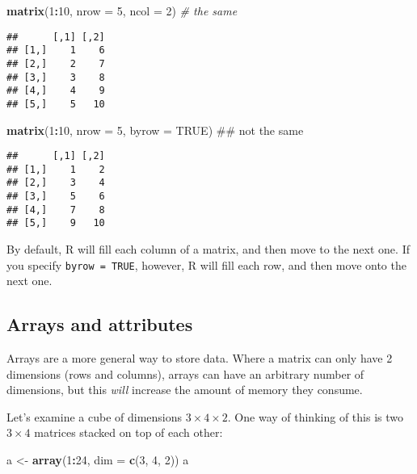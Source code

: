 \documentclass[]{article}
\newenvironment{Shaded}{\begin{snugshade}}{\end{snugshade}}
\newcommand{\KeywordTok}[1]{\textcolor[rgb]{0.13,0.29,0.53}{\textbf{#1}}}
\newcommand{\DataTypeTok}[1]{\textcolor[rgb]{0.13,0.29,0.53}{#1}}
\newcommand{\DecValTok}[1]{\textcolor[rgb]{0.00,0.00,0.81}{#1}}
\newcommand{\StringTok}[1]{\textcolor[rgb]{0.31,0.60,0.02}{#1}}
\newcommand{\CommentTok}[1]{\textcolor[rgb]{0.56,0.35,0.01}{\textit{#1}}}
\newcommand{\OtherTok}[1]{\textcolor[rgb]{0.56,0.35,0.01}{#1}}
\newcommand{\OperatorTok}[1]{\textcolor[rgb]{0.81,0.36,0.00}{\textbf{#1}}}
\newcommand{\NormalTok}[1]{#1}
\begin{document}
\begin{Shaded}
\begin{Highlighting}[]
\KeywordTok{matrix}\NormalTok{(}\DecValTok{1}\OperatorTok{:}\DecValTok{10}\NormalTok{, }\DataTypeTok{nrow =} \DecValTok{5}\NormalTok{, }\DataTypeTok{ncol =} \DecValTok{2}\NormalTok{) }\CommentTok{# the same}
\end{Highlighting}
\end{Shaded}

\begin{verbatim}
##      [,1] [,2]
## [1,]    1    6
## [2,]    2    7
## [3,]    3    8
## [4,]    4    9
## [5,]    5   10
\end{verbatim}

\begin{Shaded}
\begin{Highlighting}[]
\KeywordTok{matrix}\NormalTok{(}\DecValTok{1}\OperatorTok{:}\DecValTok{10}\NormalTok{, }\DataTypeTok{nrow =} \DecValTok{5}\NormalTok{, }\DataTypeTok{byrow =} \OtherTok{TRUE}\NormalTok{) ## not the same}
\end{Highlighting}
\end{Shaded}

\begin{verbatim}
##      [,1] [,2]
## [1,]    1    2
## [2,]    3    4
## [3,]    5    6
## [4,]    7    8
## [5,]    9   10
\end{verbatim}

By default, R will fill each column of a matrix, and then move to the
next one. If you specify \texttt{byrow = TRUE}, however, R will fill
each row, and then move onto the next one.

\subsection{Arrays and attributes}\label{arrays-and-attributes}

Arrays are a more general way to store data. Where a matrix can only
have 2 dimensions (rows and columns), arrays can have an arbitrary
number of dimensions, but this \emph{will} increase the amount of memory
they consume.

Let's examine a cube of dimensions \(3 \times 4 \times 2\). One way of
thinking of this is two \(3 \times 4\) matrices stacked on top of each
other:

\begin{Shaded}
\begin{Highlighting}[]
\NormalTok{a <-}\StringTok{ }\KeywordTok{array}\NormalTok{(}\DecValTok{1}\OperatorTok{:}\DecValTok{24}\NormalTok{, }\DataTypeTok{dim =} \KeywordTok{c}\NormalTok{(}\DecValTok{3}\NormalTok{, }\DecValTok{4}\NormalTok{, }\DecValTok{2}\NormalTok{))}
\NormalTok{a}
\end{Highlighting}
\end{Shaded}
\end{document}
